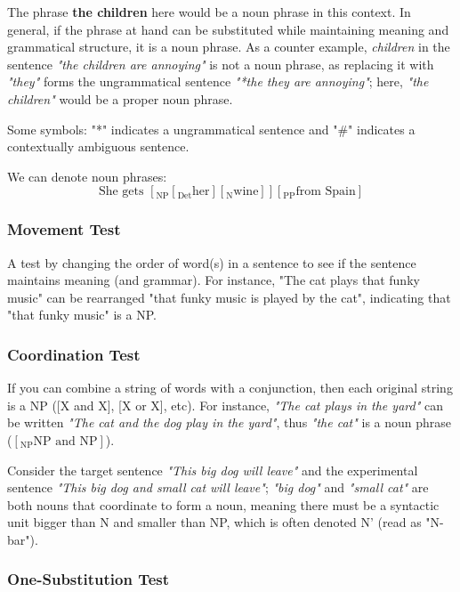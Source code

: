 \documentclass[12pt]{article}
\begin{document}
The phrase \textbf{the children} here would be a noun phrase in this context. In general, if the phrase at hand can be substituted while maintaining meaning and grammatical structure, it is a noun phrase. As a counter example, \textit{children} in the sentence \textit{"the children are annoying"} is not a noun phrase, as replacing it with \textit{"they"} forms the ungrammatical sentence \textit{"*the they are annoying"}; here, \textit{"the children"} would be a proper noun phrase.

Some symbols: "*" indicates a ungrammatical sentence and "\#" indicates a contextually ambiguous sentence.

We can denote noun phrases:\[\text{She gets } [_{\text{NP}}[_{\text{Det}} \text{her}][_{\text{N}} \text{wine}]][_{\text{PP}} \text{from Spain}]\]

\subsubsection{Movement Test}

A test by changing the order of word(s) in a sentence to see if the sentence maintains meaning (and grammar). For instance, "The cat plays that funky music" can be rearranged "that funky music is played by the cat", indicating that "that funky music" is a NP.

\subsubsection{Coordination Test}

If you can combine a string of words with a conjunction, then each original string is a NP ([X and X], [X or X], etc). For instance, \textit{"The cat plays in the yard"} can be written \textit{"The cat and the dog play in the yard"}, thus \textit{"the cat"} is a noun phrase ($[_{\text{NP}}\text{NP and NP}]$). 

Consider the target sentence \textit{"This big dog will leave"} and the experimental sentence \textit{"This big dog and small cat will leave"}; \textit{"big dog"} and \textit{"small cat"} are both nouns that coordinate to form a noun, meaning there must be a syntactic unit bigger than N and smaller than NP, which is often denoted N' (read as "N-bar"). 

\subsubsection{One-Substitution Test}
\end{document}
